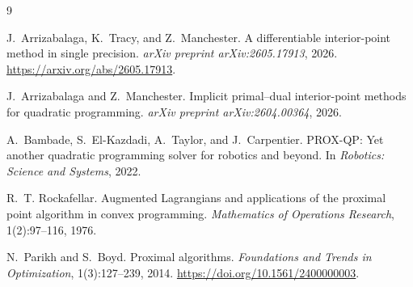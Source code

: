 \documentclass[10pt]{article}
\begin{document}
\begin{thebibliography}{9}

J.~Arrizabalaga, K.~Tracy, and Z.~Manchester.
\newblock A differentiable interior-point method in single precision.
\newblock \emph{arXiv preprint arXiv:2605.17913}, 2026.
\newblock \url{https://arxiv.org/abs/2605.17913}.

J.~Arrizabalaga and Z.~Manchester.
\newblock Implicit primal--dual interior-point methods for quadratic programming.
\newblock \emph{arXiv preprint arXiv:2604.00364}, 2026.

A.~Bambade, S.~El-Kazdadi, A.~Taylor, and J.~Carpentier.
\newblock PROX-QP: Yet another quadratic programming solver for robotics and beyond.
\newblock In \emph{Robotics: Science and Systems}, 2022.

R.~T. Rockafellar.
\newblock Augmented Lagrangians and applications of the proximal point algorithm in convex programming.
\newblock \emph{Mathematics of Operations Research}, 1(2):97--116, 1976.

N.~Parikh and S.~Boyd.
\newblock Proximal algorithms.
\newblock \emph{Foundations and Trends in Optimization}, 1(3):127--239, 2014.
\newblock \url{https://doi.org/10.1561/2400000003}.

\end{thebibliography}
\end{document}
